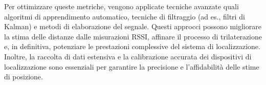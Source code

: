 Per ottimizzare queste metriche, vengono applicate tecniche avanzate quali algoritmi di apprendimento automatico, tecniche di filtraggio (ad es., filtri di Kalman) e metodi di elaborazione del segnale. Questi approcci possono migliorare la stima delle distanze dalle misurazioni RSSI, affinare il processo di trilaterazione e, in definitiva, potenziare le prestazioni complessive del sistema di localizzazione.  Inoltre, la raccolta di dati estensiva e la calibrazione accurata dei dispositivi di localizzazione sono essenziali per garantire la precisione e l'affidabilità delle stime di posizione.

